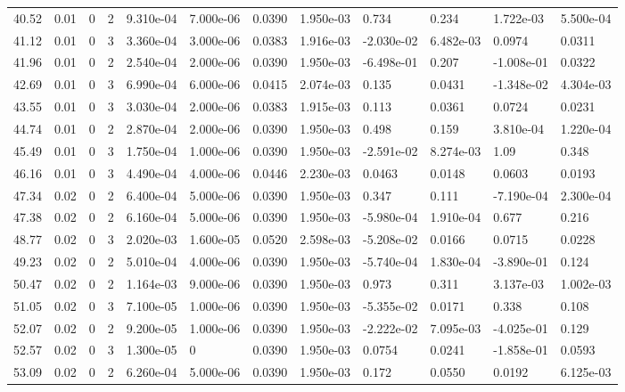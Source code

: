 \documentclass[preview]{standalone}
\begin{document}
{{{\begin{tabular}{L{1.2cm}C{1.2cm} C{0.3cm}C{0.5cm} C{1.4cm}C{1.4cm} C{1.4cm}C{1.4cm} C{1.6cm}C{1.6cm} C{1.6cm}C{1.6cm}}
  40.52  &  0.01  & 0     &  2 &  9.310e-04  & 7.000e-06  &  0.0390&   1.950e-03& 0.734 & 0.234   &  1.722e-03 & 5.500e-04  \\ 
  41.12  &  0.01  & 0     &  3 &  3.360e-04  & 3.000e-06  &  0.0383&   1.916e-03& -2.030e-02 & 6.482e-03   &  0.0974 & 0.0311  \\ 
  41.96  &  0.01  & 0     &  2 &  2.540e-04  & 2.000e-06  &  0.0390&   1.950e-03& -6.498e-01 & 0.207   &  -1.008e-01 & 0.0322  \\ 
  42.69  &  0.01  & 0     &  3 &  6.990e-04  & 6.000e-06  &  0.0415&   2.074e-03& 0.135 & 0.0431   &  -1.348e-02 & 4.304e-03  \\ 
  43.55  &  0.01  & 0     &  3 &  3.030e-04  & 2.000e-06  &  0.0383&   1.915e-03& 0.113 & 0.0361   &  0.0724 & 0.0231  \\ 
  44.74  &  0.01  & 0     &  2 &  2.870e-04  & 2.000e-06  &  0.0390&   1.950e-03& 0.498 & 0.159   &  3.810e-04 & 1.220e-04  \\ 
  45.49  &  0.01  & 0     &  3 &  1.750e-04  & 1.000e-06  &  0.0390&   1.950e-03& -2.591e-02 & 8.274e-03   &  1.09 & 0.348  \\ 
  46.16  &  0.01  & 0     &  3 &  4.490e-04  & 4.000e-06  &  0.0446&   2.230e-03& 0.0463 & 0.0148   &  0.0603 & 0.0193  \\ 
  47.34  &  0.02  & 0     &  2 &  6.400e-04  & 5.000e-06  &  0.0390&   1.950e-03& 0.347 & 0.111   &  -7.190e-04 & 2.300e-04  \\ 
  47.38  &  0.02  & 0     &  2 &  6.160e-04  & 5.000e-06  &  0.0390&   1.950e-03& -5.980e-04 & 1.910e-04   &  0.677 & 0.216  \\ 
  48.77  &  0.02  & 0     &  3 &  2.020e-03  & 1.600e-05  &  0.0520&   2.598e-03& -5.208e-02 & 0.0166   &  0.0715 & 0.0228  \\ 
  49.23  &  0.02  & 0     &  2 &  5.010e-04  & 4.000e-06  &  0.0390&   1.950e-03& -5.740e-04 & 1.830e-04   &  -3.890e-01 & 0.124  \\ 
  50.47  &  0.02  & 0     &  2 &  1.164e-03  & 9.000e-06  &  0.0390&   1.950e-03& 0.973 & 0.311   &  3.137e-03 & 1.002e-03  \\ 
  51.05  &  0.02  & 0     &  3 &  7.100e-05  & 1.000e-06  &  0.0390&   1.950e-03& -5.355e-02 & 0.0171   &  0.338 & 0.108  \\ 
  52.07  &  0.02  & 0     &  2 &  9.200e-05  & 1.000e-06  &  0.0390&   1.950e-03& -2.222e-02 & 7.095e-03   &  -4.025e-01 & 0.129  \\ 
  52.57  &  0.02  & 0     &  3 &  1.300e-05  & 0  &  0.0390&   1.950e-03& 0.0754 & 0.0241   &  -1.858e-01 & 0.0593  \\ 
  53.09  &  0.02  & 0     &  2 &  6.260e-04  & 5.000e-06  &  0.0390&   1.950e-03& 0.172 & 0.0550   &  0.0192 & 6.125e-03  \\ 
\hline 
\end{tabular} 

}}}
\end{document}
